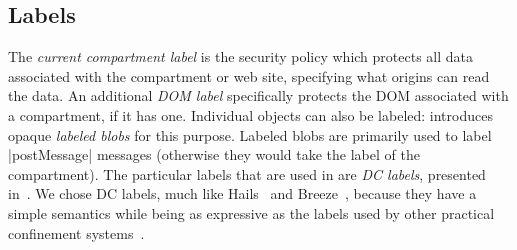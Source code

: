 
\subsection{Labels}
\label{sec:labels}

The \emph{current compartment label} is the security policy which protects all data associated with the compartment or
web site, specifying what origins can read the data.
%
An additional \emph{DOM label} specifically protects the DOM associated
with a compartment, if it has one.
%
Individual objects can also be labeled: \sys{}
introduces opaque \emph{labeled blobs} for this purpose.
%
Labeled blobs are primarily used to label \js|postMessage| messages
(otherwise they would take the label of the compartment).
%
The particular labels that are used in \sys{} are \emph{DC labels},
presented in~\cite{stefan:2011:dclabels}.
%
We chose DC labels, much like Hails~\cite{giffin:2012:hails} and
Breeze~\cite{Breeze13}, because they have a simple
semantics while being as expressive as the labels used by other practical
confinement systems~\cite{GenLabels}.
%

